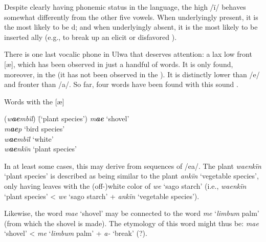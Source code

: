 Despite clearly having phonemic status in the language, the high  /ï/ behaves somewhat differently from the other five vowels. When underlyingly present, it is the  most likely to be d; and when underlyingly absent, it is the  most likely to be inserted ally (e.g., to break up an elicit or disfavored ).

  There is one last vocalic phone in Ulwa that deserves attention: a  lax  low  front   [æ], which has been observed in just a handful of words. It is only found, moreover, in the   (it has not been observed in the  ). It is distinctly lower than /e/ and fronter than /a/. So far, four words have been found with this  sound .

\ea%
    \label{ex:phon:51}
          Words with the  [æ]\\
\begin{tabbing}
{(\textit{w\textbf{ae}mbïl})} \= {(‘plant species’)}\kill
{\textit{m\textbf{ae}}} \> {‘shovel’}\\
{\textit{m\textbf{ae}p}} \> {‘bird species’}\\
{\textit{w\textbf{ae}mbïl}} \> {‘white’}\\
{\textit{w\textbf{ae}nkïn}} \> {‘plant species’}
\end{tabbing}
\z

In at least some cases, this  may derive from sequences of /ea/. The plant \textit{waenkïn} ‘plant species’ is described as being similar to the plant \textit{ankïn} ‘vegetable species’, only having leaves with the (off-)white color of \textit{we} ‘sago starch’ (i.e., \textit{waenkïn} ‘plant species’ < \textit{we} ‘sago starch’ + \textit{ankïn} ‘vegetable species’).

  Likewise, the word \textit{mae} ‘shovel’ may be connected to the word \textit{me} ‘\textit{limbum} palm’ (from which the shovel is made). The etymology of this word might thus be: \textit{mae} ‘shovel’ < \textit{me} ‘\textit{limbum} palm’ + \textit{a-} ‘break’ (?).



